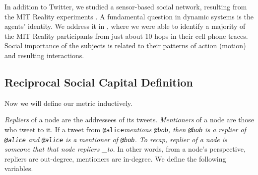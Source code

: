 \documentclass[10pt,oneside]{memoir}
\begin{document}
In addition to Twitter, we studied a sensor-based social network, resulting from the MIT Reality experiments \cite{Eagle:2006:Reality}. A fundamental question in dynamic systems is the agents' identity. We address it in \cite{Khrabrov:2009:Language}, where we were able to identify a majority of the MIT Reality participants from just about 10 hops in their cell phone traces. Social importance of the subjects is related to their patterns of action (motion) and resulting interactions.


\pagebreak \subsection{Reciprocal Social Capital Definition}
\label{reciprocalsocialcapitaldefinition}

Now we will define our metric inductively.


{\itshape Repliers} of a node are the addressees of its tweets. {\itshape Mentioners} of a node are those who tweet to it. If a tweet from \texttt{@alice}{\itshape mentions \texttt{@bob}, then \texttt{@bob} is a replier of \texttt{@alice} and \texttt{@alice} is a mentioner of \texttt{@bob}. To recap, replier of a node is someone that that node repliers \_to}. In other words, from a node's perspective, repliers are out-degree, mentioners are in-degree.  We define the following variables.
\end{document}
